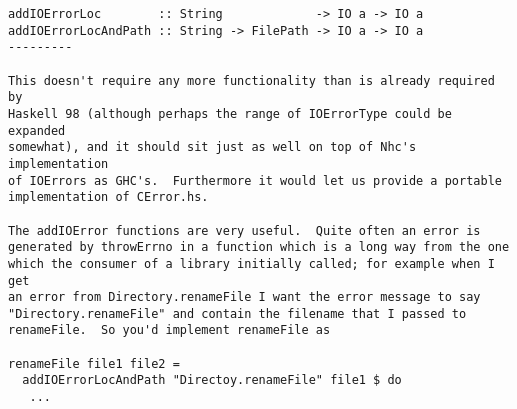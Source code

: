 \documentclass[a4paper,twosides]{article}
\begin{document}
\begin{DRAFT}
\begin{verbatim}
addIOErrorLoc        :: String             -> IO a -> IO a
addIOErrorLocAndPath :: String -> FilePath -> IO a -> IO a
---------

This doesn't require any more functionality than is already required by
Haskell 98 (although perhaps the range of IOErrorType could be expanded
somewhat), and it should sit just as well on top of Nhc's implementation
of IOErrors as GHC's.  Furthermore it would let us provide a portable
implementation of CError.hs.

The addIOError functions are very useful.  Quite often an error is
generated by throwErrno in a function which is a long way from the one
which the consumer of a library initially called; for example when I get
an error from Directory.renameFile I want the error message to say
"Directory.renameFile" and contain the filename that I passed to
renameFile.  So you'd implement renameFile as

renameFile file1 file2 = 
  addIOErrorLocAndPath "Directoy.renameFile" file1 $ do
   ...
\end{verbatim}%

\end{DRAFT}
\end{document}
